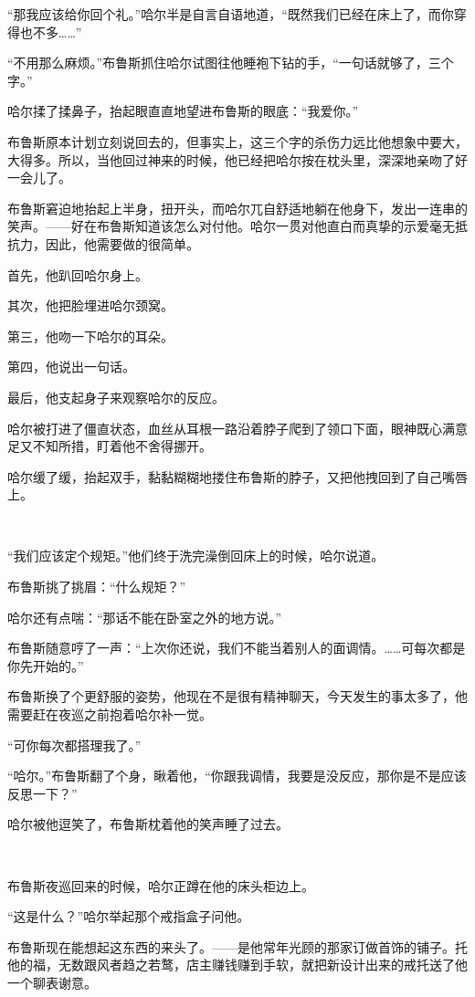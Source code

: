 \documentclass[../main.tex]{subfiles}
\begin{document}
“那我应该给你回个礼。”哈尔半是自言自语地道，“既然我们已经在床上了，而你穿得也不多……”

“不用那么麻烦。”布鲁斯抓住哈尔试图往他睡袍下钻的手，“一句话就够了，三个字。”

哈尔揉了揉鼻子，抬起眼直直地望进布鲁斯的眼底：“我爱你。”

布鲁斯原本计划立刻说回去的，但事实上，这三个字的杀伤力远比他想象中要大，大得多。所以，当他回过神来的时候，他已经把哈尔按在枕头里，深深地亲吻了好一会儿了。

布鲁斯窘迫地抬起上半身，扭开头，而哈尔兀自舒适地躺在他身下，发出一连串的笑声。——好在布鲁斯知道该怎么对付他。哈尔一贯对他直白而真挚的示爱毫无抵抗力，因此，他需要做的很简单。

首先，他趴回哈尔身上。

其次，他把脸埋进哈尔颈窝。

第三，他吻一下哈尔的耳朵。

第四，他说出一句话。

最后，他支起身子来观察哈尔的反应。

哈尔被打进了僵直状态，血丝从耳根一路沿着脖子爬到了领口下面，眼神既心满意足又不知所措，盯着他不舍得挪开。

哈尔缓了缓，抬起双手，黏黏糊糊地搂住布鲁斯的脖子，又把他拽回到了自己嘴唇上。

~\

“我们应该定个规矩。”他们终于洗完澡倒回床上的时候，哈尔说道。

布鲁斯挑了挑眉：“什么规矩？”

哈尔还有点喘：“那话不能在卧室之外的地方说。”

布鲁斯随意哼了一声：“上次你还说，我们不能当着别人的面调情。……可每次都是你先开始的。”

布鲁斯换了个更舒服的姿势，他现在不是很有精神聊天，今天发生的事太多了，他需要赶在夜巡之前抱着哈尔补一觉。

“可你每次都搭理我了。”

“哈尔。”布鲁斯翻了个身，瞅着他，“你跟我调情，我要是没反应，那你是不是应该反思一下？”

哈尔被他逗笑了，布鲁斯枕着他的笑声睡了过去。

~\

布鲁斯夜巡回来的时候，哈尔正蹲在他的床头柜边上。

“这是什么？”哈尔举起那个戒指盒子问他。

布鲁斯现在能想起这东西的来头了。——是他常年光顾的那家订做首饰的铺子。托他的福，无数跟风者趋之若鹜，店主赚钱赚到手软，就把新设计出来的戒托送了他一个聊表谢意。
\end{document}
